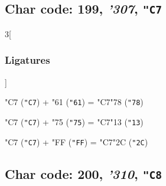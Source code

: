 \documentclass{article}
\newlength{\maxcharwidth}
\begin{document}
\subsection{Char code: 199, {\it'307}, {\tt"C7}}
\label{char_199}


\begin{multicols}{3}[\subsubsection{Ligatures}]

{\testfont\char"C7\noboundary} ({\tt"C7}) + {\testfont\char"61\noboundary} ({\tt"61}) = {\testfont\char"C7\noboundary}{\testfont\char"78\noboundary} ({\tt"78}) 

{\testfont\char"C7\noboundary} ({\tt"C7}) + {\testfont\char"75\noboundary} ({\tt"75}) = {\testfont\char"C7\noboundary}{\testfont\char"13\noboundary} ({\tt"13}) 

{\testfont\char"C7\noboundary} ({\tt"C7}) + {\testfont\char"FF\noboundary} ({\tt"FF}) = {\testfont\char"C7\noboundary}{\testfont\char"2C\noboundary} ({\tt"2C}) 

\end{multicols}

\subsection{Char code: 200, {\it'310}, {\tt"C8}}
\label{char_200}

\end{document}
